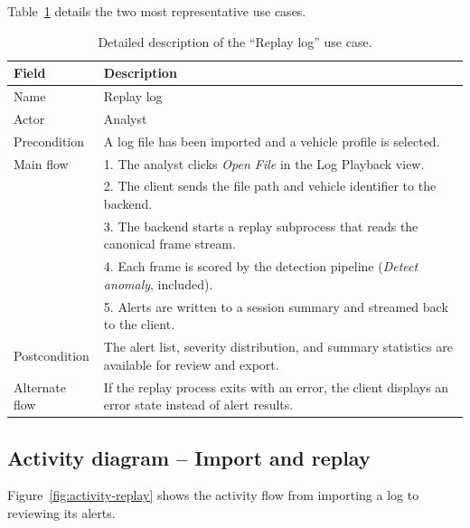 Table~\ref{tab:usecase-detail} details the two most representative use cases.

\begin{table}[H]
\centering
\caption{Detailed description of the ``Replay log'' use case.}
\label{tab:usecase-detail}
\begin{tabularx}{\textwidth}{@{}lX@{}}
\toprule
\textbf{Field} & \textbf{Description} \\
\midrule
Name & Replay log \\
Actor & Analyst \\
Precondition & A log file has been imported and a vehicle profile is selected. \\
Main flow &
1. The analyst clicks \emph{Open File} in the Log Playback view.\\
& 2. The client sends the file path and vehicle identifier to the backend.\\
& 3. The backend starts a replay subprocess that reads the canonical frame stream.\\
& 4. Each frame is scored by the detection pipeline (\emph{Detect anomaly}, included).\\
& 5. Alerts are written to a session summary and streamed back to the client.\\
Postcondition & The alert list, severity distribution, and summary statistics are available for review and export. \\
Alternate flow & If the replay process exits with an error, the client displays an error state instead of alert results. \\
\bottomrule
\end{tabularx}
\end{table}

\subsection{Activity diagram -- Import and replay}

Figure~\ref{fig:activity-replay} shows the activity flow from importing a log to reviewing its alerts.


